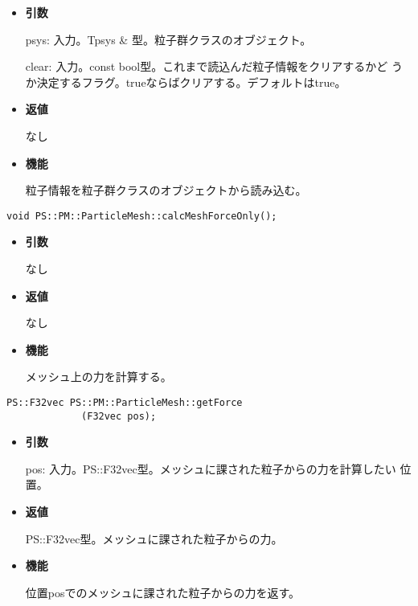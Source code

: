 \begin{itemize}

\item {\bf 引数}

  psys: 入力。Tpsys \& 型。粒子群クラスのオブジェクト。

  clear: 入力。const bool型。これまで読込んだ粒子情報をクリアするかど
  うか決定するフラグ。trueならばクリアする。デフォルトはtrue。

\item {\bf 返値}

  なし

\item {\bf 機能}

  粒子情報を粒子群クラスのオブジェクトから読み込む。

\end{itemize}


\begin{screen}
\begin{verbatim}
void PS::PM::ParticleMesh::calcMeshForceOnly();
\end{verbatim}
\end{screen}

\begin{itemize}

\item {\bf 引数}

  なし

\item {\bf 返値}

  なし

\item {\bf 機能}

  メッシュ上の力を計算する。

\end{itemize}


\begin{screen}
\begin{verbatim}
PS::F32vec PS::PM::ParticleMesh::getForce
             (F32vec pos);
\end{verbatim}
\end{screen}

\begin{itemize}

\item {\bf 引数}

  pos: 入力。PS::F32vec型。メッシュに課された粒子からの力を計算したい
  位置。

\item {\bf 返値}

  PS::F32vec型。メッシュに課された粒子からの力。

\item {\bf 機能}

  位置posでのメッシュに課された粒子からの力を返す。

\end{itemize}

